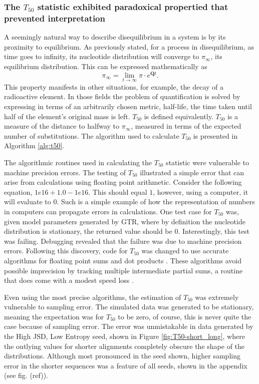 

\subsubsection*{The $T_{50}$ statistic exhibited paradoxical propertied that prevented interpretation}

A seemingly natural way to describe disequilibrium in a system is by its proximity to equilibrium. As previously stated, for a process in disequilibrium, as time goes to infinity, its nucleotide distribution will converge to $\pi_\infty$, its equilibrium distribution. This can be expressed mathematically as 
$$\pi_\infty = \lim_{t \to \infty}\pi \cdot e^{\mathbf{Q}t}.$$ 
This property manifests in other situations, for example, the decay of a radioactive element. In those fields the problem of quantification is solved by expressing in terms of an arbitrarily chosen metric, half-life, the time taken until half of the element's original mass is left. $T_{50}$ is defined equivalently. ${T_{50}}$ is a measure of the distance to halfway to $\pi_\infty$, measured in terms of the expected number of substitutions. The algorithm used to calculate $T_{50}$ is presented in Algorithm \ref{alg:t50}.



The algorithmic routines used in calculating the $T_{50}$ statistic were vulnerable to machine precision errors. The testing of $T_{50}$ illustrated a simple error that can arise from calculations using \gls{floating point arithmetic}. Consider the following equation, $1e16 + 1.0 - 1e16$. This should equal $1$, however, using a computer, it will evaluate to $0$. Such is a simple example of how the representation of numbers in computers can propagate errors in calculations. One test case for $T_{50}$ was, given model parameters generated by GTR, where by definition the nucleotide distribution is stationary, the returned value should be $0$. Interestingly, this test was failing. Debugging revealed that the failure was due to machine precision errors. Following this discovery, code for $T_{50}$ was changed to use accurate algorithms for floating point sums and dot products \citep{accupy}. These algorithms avoid possible imprecision by tracking multiple intermediate partial sums, a routine that does come with a modest speed loss \citep{Shewchuk1997AdaptivePredicates, Ogita2005AccurateProduct}. 

Even using the most precise algorithms, the estimation of $T_{50}$ was extremely vulnerable to sampling error. The simulated data was generated to be stationary, meaning the expectation was for $T_{50}$ to be zero, of course, this is never quite the case because of sampling error. The error was unmistakable in data generated by the High JSD, Low Entropy seed, shown in Figure \ref{fig:T50-short_long}, where the outlying values for shorter alignments completely obscure the shape of the distributions. Although most pronounced in the seed shown, higher sampling error in the shorter sequences was a feature of all seeds, shown in the appendix (see fig. (ref)). 

